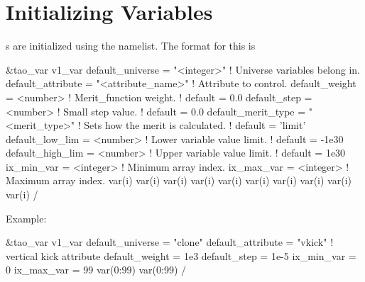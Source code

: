{{{{{{{{{%
\section{Initializing Variables}
\label{s:init_var} 

s are initialized using the  namelist. The
format for this is
\begin{example}
  &tao_var
    v1_var%
    default_universe   = "<integer>"         ! Universe variables belong in.
    default_attribute  = "<attribute_name>"  ! Attribute to control.
    default_weight     = <number>            ! Merit_function weight.
                                             ! default = 0.0
    default_step       = <number>            ! Small step value.
                                             ! default = 0.0
    default_merit_type = "<merit_type>"      ! Sets how the merit is calculated.
                                             ! default = 'limit'
    default_low_lim    = <number>            ! Lower variable value limit. 
                                             ! default = -1e30
    default_high_lim   = <number>            ! Upper variable value limit. 
                                             ! default =  1e30
    ix_min_var         = <integer>           ! Minimum array index.
    ix_max_var         = <integer>           ! Maximum array index.
    var(i)%
    var(i)%
    var(i)%
    var(i)%
    var(i)%
    var(i)%
    var(i)%
    var(i)%
    var(i)%
    var(i)%
  /
\end{example}
Example:
\begin{example}
  &tao_var
    v1_var%
    default_universe  = "clone"
    default_attribute = "vkick"     ! vertical kick attribute
    default_weight    = 1e3
    default_step      = 1e-5
    ix_min_var        = 0
    ix_max_var        = 99
    var(0:99)%
    var(0:99)%
  /
\end{example}

}}}}}}}}}
